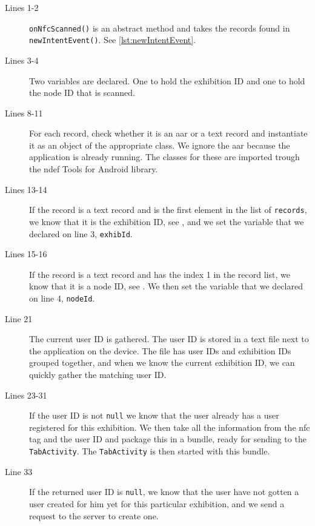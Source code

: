 \begin{description}
\item[Lines 1-2] \lstinline|onNfcScanned()| is an abstract method and takes the records found in \lstinline|newIntentEvent()|. See \autoref{lst:newIntentEvent}.
\item[Lines 3-4] Two variables are declared. One to hold the exhibition ID and one to hold the node ID that is scanned.
\item[Lines 8-11] For each record, check whether it is an \ac{aar} or a text record and instantiate it as an object of the appropriate class. We ignore the \ac{aar} because the application is already running. The classes for these are imported trough the \ac{ndef} Tools for Android \citep{ndeftools} library.
\item[Lines 13-14] If the record is a text record and is the first element in the list of \lstinline|records|, we know that it is the exhibition ID, see , and we set the variable that we declared on line 3, \lstinline|exhibId|.
\item[Lines 15-16] If the record is a text record and has the index 1 in the record list, we know that it is a node ID, see . We then set the variable that we declared on line 4, \lstinline|nodeId|.
\item[Line 21] The current user ID is gathered. The user ID is stored in a text file next to the application on the device. The file has user IDs and exhibition IDs grouped together, and when we know the current exhibition ID, we can quickly gather the matching user ID.
\item[Lines 23-31] If the user ID is not \lstinline|null| we know that the user already has a user registered for this exhibition. We then take all the information from the \ac{nfc} tag and the user ID and package this in a bundle, ready for sending to the \lstinline|TabActivity|. The \lstinline|TabActivity| is then started with this bundle.
\item[Line 33] If the returned user ID is \lstinline|null|, we know that the user have not gotten a user created for him yet for this particular exhibition, and we send a request to the server to create one.
\end{description}


